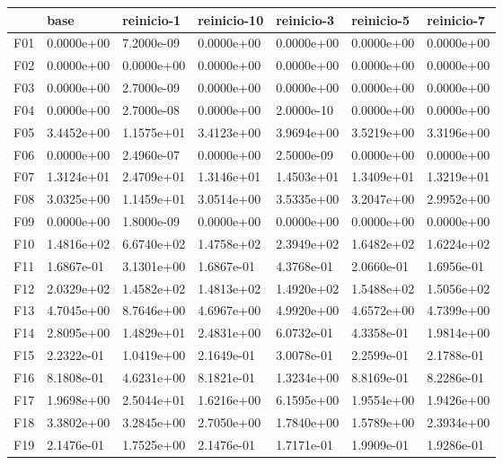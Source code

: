 \begin{tabular}{lllllll}
\toprule
{} &        base &  reinicio-1 & reinicio-10 &  reinicio-3 &  reinicio-5 &  reinicio-7 \\
\midrule
F01  &  0.0000e+00 &  7.2000e-09 &  0.0000e+00 &  0.0000e+00 &  0.0000e+00 &  0.0000e+00 \\
F02  &  0.0000e+00 &  0.0000e+00 &  0.0000e+00 &  0.0000e+00 &  0.0000e+00 &  0.0000e+00 \\
F03  &  0.0000e+00 &  2.7000e-09 &  0.0000e+00 &  0.0000e+00 &  0.0000e+00 &  0.0000e+00 \\
F04  &  0.0000e+00 &  2.7000e-08 &  0.0000e+00 &  2.0000e-10 &  0.0000e+00 &  0.0000e+00 \\
F05  &  3.4452e+00 &  1.1575e+01 &  3.4123e+00 &  3.9694e+00 &  3.5219e+00 &  3.3196e+00 \\
F06  &  0.0000e+00 &  2.4960e-07 &  0.0000e+00 &  2.5000e-09 &  0.0000e+00 &  0.0000e+00 \\
F07  &  1.3124e+01 &  2.4709e+01 &  1.3146e+01 &  1.4503e+01 &  1.3409e+01 &  1.3219e+01 \\
F08  &  3.0325e+00 &  1.1459e+01 &  3.0514e+00 &  3.5335e+00 &  3.2047e+00 &  2.9952e+00 \\
F09  &  0.0000e+00 &  1.8000e-09 &  0.0000e+00 &  0.0000e+00 &  0.0000e+00 &  0.0000e+00 \\
F10  &  1.4816e+02 &  6.6740e+02 &  1.4758e+02 &  2.3949e+02 &  1.6482e+02 &  1.6224e+02 \\
F11  &  1.6867e-01 &  3.1301e+00 &  1.6867e-01 &  4.3768e-01 &  2.0660e-01 &  1.6956e-01 \\
F12  &  2.0329e+02 &  1.4582e+02 &  1.4813e+02 &  1.4920e+02 &  1.5488e+02 &  1.5056e+02 \\
F13  &  4.7045e+00 &  8.7646e+00 &  4.6967e+00 &  4.9920e+00 &  4.6572e+00 &  4.7399e+00 \\
F14  &  2.8095e+00 &  1.4829e+01 &  2.4831e+00 &  6.0732e-01 &  4.3358e-01 &  1.9814e+00 \\
F15  &  2.2322e-01 &  1.0419e+00 &  2.1649e-01 &  3.0078e-01 &  2.2599e-01 &  2.1788e-01 \\
F16  &  8.1808e-01 &  4.6231e+00 &  8.1821e-01 &  1.3234e+00 &  8.8169e-01 &  8.2286e-01 \\
F17  &  1.9698e+00 &  2.5044e+01 &  1.6216e+00 &  6.1595e+00 &  1.9554e+00 &  1.9426e+00 \\
F18  &  3.3802e+00 &  3.2845e+00 &  2.7050e+00 &  1.7840e+00 &  1.5789e+00 &  2.3934e+00 \\
F19  &  2.1476e-01 &  1.7525e+00 &  2.1476e-01 &  1.7171e-01 &  1.9909e-01 &  1.9286e-01 \\

\end{tabular}
